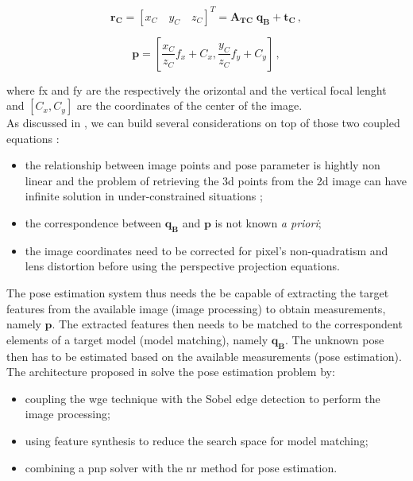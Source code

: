 \begin{equation}
  \mathbf{r_C} = \left[x_C \quad  y_C \quad z_C\right]^T = \mathbf{A_{TC}} \; \mathbf{q_B} + \mathbf{t_C} \,,
\end{equation}

\begin{equation}
  \mathbf{p} = \left[ \frac{x_C}{z_C} f_x + C_x , \frac{y_C}{z_C} f_y + C_y \right] \,,
\end{equation}

where \gls{fx} and \gls{fy} are the respectively the orizontal and the vertical focal lenght and $[C_x, C_y]$ are the coordinates of the center of the image.\\
As discussed in \cite{D2014}, we can build several considerations on top of those two coupled equations :

\begin{itemize}
  \item the relationship between image points and pose parameter is hightly non linear and the problem of retrieving the \acrshort{3d} points from the \acrshort{2d} image can have infinite solution in under-constrained situations \cite{10.1145/358669.358692};
  \item the correspondence between $\mathbf{q_B}$ and $\mathbf{p}$ is not known \textit{a priori};
  \item the image coordinates need to be corrected for pixel's non-quadratism and lens distortion before using the perspective projection equations.
\end{itemize}

The pose estimation system thus needs the be capable of extracting the target features from the available image (image processing) to obtain measurements, namely  $\mathbf{p}$. The extracted features then needs to be matched to the correspondent elements of a target model (model matching), namely $\mathbf{q_B}$. The unknown pose then has to be estimated based on the available measurements (pose estimation).
The architecture proposed in \cite{Sharma2018} solve the pose estimation problem by:

\begin{itemize}
  \item coupling the \acrfull{wge} technique with the Sobel edge detection to perform the image processing;
  \item using feature synthesis to reduce the search space for model matching;
  \item combining a \acrshort{pnp} solver with the \acrfull{nr} method for pose estimation.
\end{itemize}

